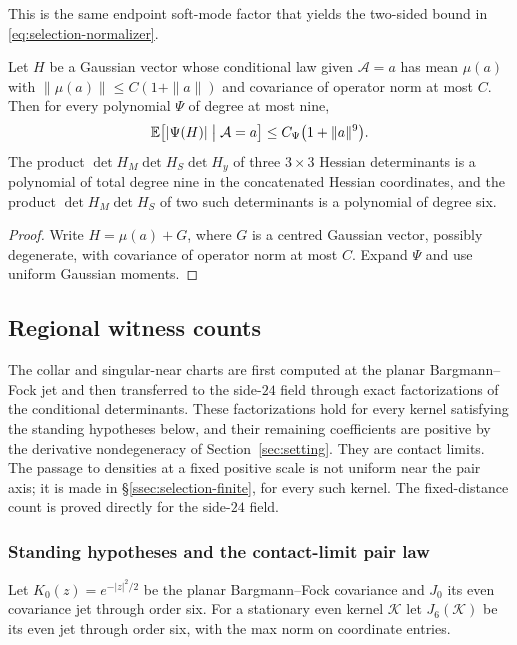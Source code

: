 This is the same endpoint soft-mode factor that yields the two-sided bound in \eqref{eq:selection-normalizer}.

\begin{lemma}\label{lem:selection-moments}
Let $H$ be a Gaussian vector whose conditional law given $\mathcal A=a$ has mean $\mu(a)$ with $\|\mu(a)\|\le C(1+\|a\|)$ and covariance of operator norm at most $C$. Then for every polynomial $\Psi$ of degree at most nine,
\begin{equation}\label{eq:selection-moment9}
\mathbb E\bigl[|\Psi(H)|\bigm|\mathcal A=a\bigr]\le C_\Psi\bigl(1+\|a\|^9\bigr).
\end{equation}
The product $\det H_M\det H_S\det H_y$ of three $3\times3$ Hessian determinants is a polynomial of total degree nine in the concatenated Hessian coordinates, and the product $\det H_M\det H_S$ of two such determinants is a polynomial of degree six.
\end{lemma}

\begin{proof}
Write $H=\mu(a)+G$, where $G$ is a centred Gaussian vector, possibly degenerate, with covariance of operator norm at most $C$. Expand $\Psi$ and use uniform Gaussian moments.
\end{proof}

\subsection{Regional witness counts}\label{ssec:selection-witness}

The collar and singular-near charts are first computed at the planar Bargmann--Fock jet and then transferred to the side-$24$ field through exact factorizations of the conditional determinants. These factorizations hold for every kernel satisfying the standing hypotheses below, and their remaining coefficients are positive by the derivative nondegeneracy of Section~\ref{sec:setting}. They are contact limits. The passage to densities at a fixed positive scale is not uniform near the pair axis; it is made in \S\ref{ssec:selection-finite}, for every such kernel. The fixed-distance count is proved directly for the side-$24$ field.

\subsubsection{Standing hypotheses and the contact-limit pair law}

Let $K_0(z)=e^{-|z|^2/2}$ be the planar Bargmann--Fock covariance and $J_0$ its even covariance jet through order six. For a stationary even kernel $\mathcal K$ let $J_6(\mathcal K)$ be its even jet through order six, with the max norm on coordinate entries.

